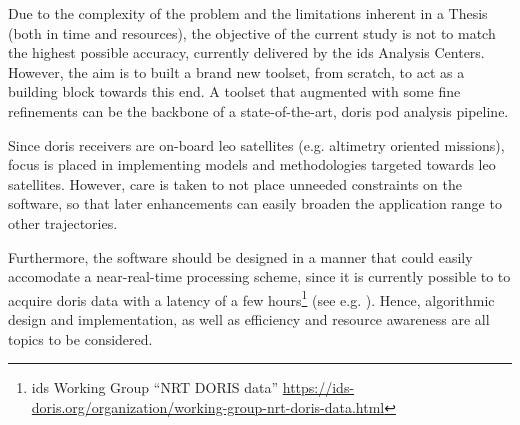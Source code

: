 Due to the complexity of the problem and the limitations inherent in a Thesis 
(both in time and resources), the objective of the current study is not to match 
the highest possible accuracy, currently delivered by the \gls{ids} Analysis 
Centers. However, the aim is to built a brand new toolset, from scratch, to act as 
a building block towards this end. A toolset that augmented with some fine 
refinements can be the backbone of a state-of-the-art, \gls{doris} \gls{pod} 
analysis pipeline.

Since \gls{doris} receivers are on-board \gls{leo} satellites (e.g. altimetry 
oriented missions), focus is placed in implementing models and methodologies 
targeted towards \gls{leo} satellites. However, care is taken to not place 
unneeded constraints on the software, so that later enhancements can easily 
broaden the application range to other trajectories.

Furthermore, the software should be designed in a manner that could easily 
accomodate a near-real-time processing scheme, since it is currently possible to 
to acquire \gls{doris} data with a latency of a few hours\footnote{\gls{ids} Working Group ``NRT DORIS data'' \url{https://ids-doris.org/organization/working-group-nrt-doris-data.html}} (see e.g. \cite{Wang2022}).
Hence, algorithmic design and implementation, as well as efficiency and resource 
awareness are all topics to be considered.

\iffalse
This thesis is a study of orbit determination for \gls{leo} satellites, using the \gls{doris}
The aim is a robust methodology, providing
quality satellite state estimates, one though that can be efficient enough to be implemented for near-real time
applications. Hence, algorithmic design and implementation, as well as efficiency and resource awareness are all
topics to be considered. This thesis took place under a frame of an ambitious, nearly over optimistic goal, for
Dionysos Satellite Observatory to develop an orbit determination tool of its own; with this thesis, the groundwork
is more than laid. At international level, only a handful of such high-quality software tools exist, developed and
used by high caliber renowned institutions, with critical impact in the field of geodetic studies.
Guidelines set by the \gls{ids} act as the de-facto standard for orbit determination
via \gls{doris}. In this thesis we try to comply with this set of recommendations as close as possible, deviating when
needed to check and validate alternate or novel processing approaches.
\fi


